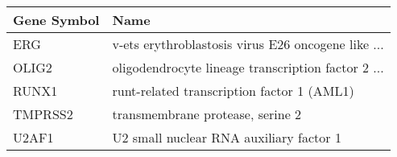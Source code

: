 \begin{tabular}{ll}
\toprule
Gene Symbol &                                               Name \\
\midrule
        ERG & v-ets erythroblastosis virus E26 oncogene like ... \\
      OLIG2 & oligodendrocyte lineage transcription factor 2 ... \\
      RUNX1 &        runt-related transcription factor 1  (AML1) \\
    TMPRSS2 &                   transmembrane protease, serine 2 \\
      U2AF1 &            U2 small nuclear RNA auxiliary factor 1 \\
\bottomrule
\end{tabular}
